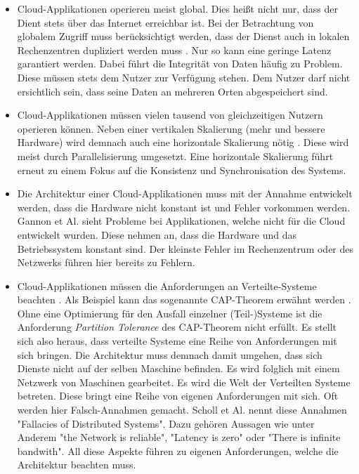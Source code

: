 \begin{itemize}
    \item Cloud-Applikationen operieren meist global. Dies heißt nicht nur, dass der Dient stets über das Internet erreichbar ist. Bei der Betrachtung von globalem Zugriff muss berücksichtigt werden, dass der Dienst auch in lokalen Rechenzentren dupliziert werden muss \cite{gannon_cloud-native_2017}. Nur so kann eine geringe Latenz garantiert werden. Dabei führt die Integrität von Daten häufig zu Problem. Diese müssen stets dem Nutzer zur Verfügung stehen. Dem Nutzer darf nicht ersichtlich sein, dass seine Daten an mehreren Orten abgespeichert sind.  
    \item Cloud-Applikationen müssen vielen tausend von gleichzeitigen Nutzern operieren können. Neben einer vertikalen Skalierung (mehr und bessere Hardware) wird demnach auch eine horizontale Skalierung nötig \cite{gannon_cloud-native_2017}. Diese wird meist durch Parallelisierung umgesetzt. Eine horizontale Skalierung führt erneut zu einem Fokus auf die Konsistenz und Synchronisation des Systems. 
    \item Die Architektur einer Cloud-Applikationen muss mit der Annahme entwickelt werden, dass die Hardware nicht konstant ist und Fehler vorkommen werden. Gannon et Al. \cite{gannon_cloud-native_2017} sieht Probleme bei Applikationen, welche nicht für die Cloud entwickelt wurden. Diese nehmen an, dass die Hardware und das Betriebssystem konstant sind. Der kleinste Fehler im Rechenzentrum oder des Netzwerks führen hier bereits zu Fehlern. 
    \item Cloud-Applikationen müssen die Anforderungen an Verteilte-Systeme beachten \cite{scholl_cloud_2019}. Als Beispiel kann das sogenannte CAP-Theorem erwähnt werden \cite{julianbrowne_brewers_nodate}. Ohne eine Optimierung für den Ausfall einzelner (Teil-)Systeme ist die Anforderung \textit{Partition Tolerance} des CAP-Theorem nicht erfüllt. Es stellt sich also heraus, dass verteilte Systeme eine Reihe von Anforderungen mit sich bringen. Die Architektur muss demnach damit umgehen, dass sich Dienste nicht auf der selben Maschine befinden. Es wird folglich mit einem Netzwerk von Maschinen gearbeitet. Es wird die Welt der Verteilten Systeme betreten. Diese bringt eine Reihe von eigenen Anforderungen mit sich. Oft werden hier Falsch-Annahmen gemacht. Scholl et Al. \cite{scholl_cloud_2019} nennt diese Annahmen "Fallacies of Distributed Systems". Dazu gehören Aussagen wie unter Anderem "the Network is reliable", "Latency is zero" oder "There is infinite bandwith". All diese Aspekte führen zu eigenen Anforderungen, welche die Architektur beachten muss.

\end{itemize}
